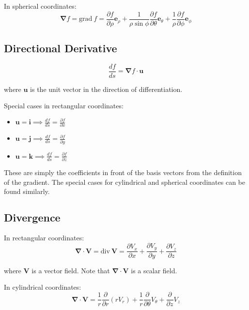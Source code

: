 In spherical coordinates:
\begin{equation*}
    \bm{\nabla} f = \text{grad}~f = \frac{\partial f}{\partial \rho}\mathbf{e}_\rho + \frac{1}{\rho\sin\phi}\frac{\partial f}{\partial \theta}\mathbf{e}_\theta + \frac{1}{\rho}\frac{\partial f}{\partial \phi}\mathbf{e}_\phi
\end{equation*}

\subsection{Directional Derivative}

\begin{equation*}
    \frac{df}{ds} = \bm{\nabla} f \cdot \mathbf{u}
\end{equation*}

where $\mathbf{u}$ is the unit vector in the direction of differentiation.

\vsp

Special cases in rectangular coordinates:
\begin{itemize}
    \item $\mathbf{u} = \mathbf{i} \implies \frac{df}{ds} = \frac{\partial f}{\partial x}$
    \item $\mathbf{u} = \mathbf{j} \implies \frac{df}{ds} = \frac{\partial f}{\partial y}$
    \item $\mathbf{u} = \mathbf{k} \implies \frac{df}{ds} = \frac{\partial f}{\partial z}$
\end{itemize}

These are simply the coefficients in front of the basis vectors from the definition of the gradient. The special cases for cylindrical and spherical coordinates can be found similarly.

\subsection{Divergence}

In rectangular coordinates:
\begin{equation*}
    \bm{\nabla} \cdot \mathbf{V} = \text{div}~\mathbf{V} = \frac{\partial V_x}{\partial x} + \frac{\partial V_y}{\partial y} + \frac{\partial V_z}{\partial z}
\end{equation*}

where $\mathbf{V}$ is a vector field. Note that $\bm{\nabla}\cdot\mathbf{V}$ is a scalar field.

\vsp

In cylindrical coordinates:
\begin{equation*}
    \bm{\nabla} \cdot \mathbf{V} = \frac{1}{r}\frac{\partial}{\partial r}(rV_r) + \frac{1}{r}\frac{\partial}{\partial \theta}V_\theta + \frac{\partial}{\partial z}V_z
\end{equation*}

